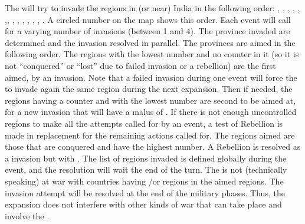 \phevnt
\aparag The \paysMogol will try to invade the regions in (or near) India in
the following order: \granderegionDelhi, \granderegionAfghanistan,
\granderegionAoudh, \granderegionBengale, \granderegionGujarat,
\granderegionPendjab,\granderegionIndus, \granderegionBalouchistan,
\granderegionOrissa, \granderegionGondwana, \granderegionMumbai,
\granderegionHyderabad, \granderegionMalabar, \granderegionKarnatika. A
circled number on the map shows this order.
\aparag Each event will call for a varying number of invasions (between 1 and
4). The province invaded are determined and the invasion resolved in
parallel. The provinces are aimed in the following order.
\bparag The regions with the lowest number and no \paysMogol
{} counter in it (so it is not ``conquered'' or ``lost'' due
to failed invasion or a rebellion) are the first aimed, by an invasion. Note
that a failed invasion during one event will force the \paysMogol to invade
again the same region during the next expansion.
\bparag Then if needed, the regions having a \paysMogol {} counter and with the lowest number are second to be aimed at, for a
new invasion that will have a malus of .
\bparag If there is not enough uncontrolled regions to make all the attempts
called for by an event, a test of Rebellion is made in replacement for the
remaining actions called for. The regions aimed are those that are conquered
and have the highest number. A Rebellion is resolved as a invasion but with
.
\aparag The list of regions invaded is defined globally during the event, and
the resolution will wait the end of the turn. The \paysMogol is not
(technically speaking) at war with countries having \TP/\COL or regions in the
aimed regions. The invasion attempt will be resolved at the end of the
military phases. Thus, the expansion does not interfere with other kinds of
war that can take place and involve the \paysMogol.

